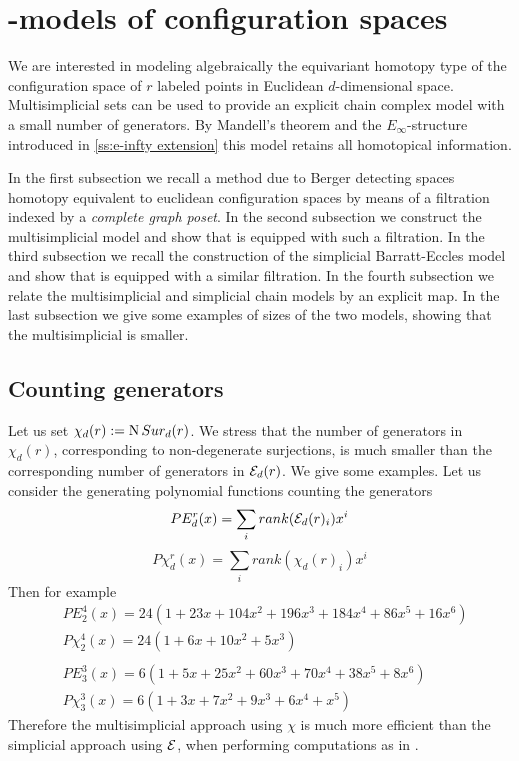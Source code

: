 
\section{\pdfEinfty-models of configuration spaces}

We are interested in modeling algebraically the equivariant homotopy type of the configuration space of $r$ labeled points in Euclidean $d$-dimensional space.
Multisimplicial sets can be used to provide an explicit chain complex model with a small number of generators.
By Mandell's theorem \cite{mandell2006homotopy_type} and the $E_\infty$-structure introduced in \cref{ss:e-infty extension} this model retains all homotopical information.

In the first subsection we recall a method due to Berger detecting spaces homotopy equivalent to euclidean configuration spaces by means of a filtration indexed by a {\em complete graph poset}.    
In the second subsection we construct the multisimplicial model and show that is equipped with such a filtration.
In the third subsection we recall the construction of the simplicial Barratt-Eccles model and show that is  equipped with a similar filtration.
In the fourth subsection we relate the multisimplicial and simplicial chain models by an explicit map. In the last subsection we give some examples of sizes of the two models, showing that the multisimplicial is smaller.




\subsection{Counting generators}

Let us set $\chi_d(r):=\operatorname{N}Sur_{d}(r)$. We stress that the number of generators in $\chi_d(r)$, corresponding to non-degenerate surjections, is much smaller than the corresponding number of generators in $\mathcal{E}_d(r)$.
We give some examples.
Let us consider the generating polynomial functions counting the generators
$$PE_d^r(x) = \sum_i rank(\mathcal{E}_d(r)_i) x^i $$ $$P\chi_d^r(x)=
\sum_i rank(\chi_d(r)_i) x^i$$
Then for example
\begin{align*}
	& PE_2^4(x)=24(1+23x+104x^2+196x^3+184x^4+86x^5+16x^6)\\
	& P\chi_2^4(x)=24(1+6x+10x^2+5x^3) \\
	& \\
	& PE_3^3(x) = 6(1+5x+25x^2+60x^3+70x^4+38x^5+8x^6 ) \\
	&  P\chi_3^3(x)= 6(1+3x+7x^2+9x^3+6x^4+x^5)
\end{align*}
Therefore the multisimplicial approach using $\chi$ is much more efficient than the simplicial
approach using $\mathcal{E}$, when performing computations as in \cite{salvatore2020planarnonformality}.

